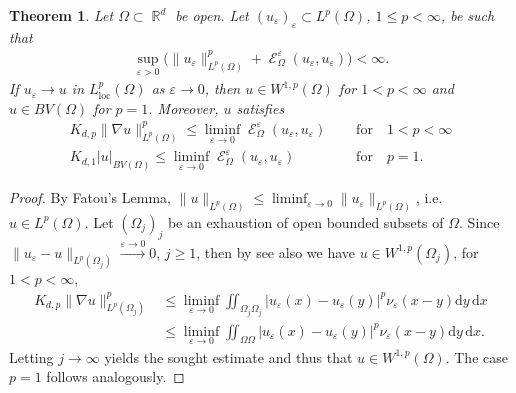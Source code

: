 \documentclass[12pt, reqno]{amsart}%
\theoremstyle{plain}  %
\newtheorem{theorem}{Theorem}[section]
\theoremstyle{definition}  %
\numberwithin{equation}{section}
\DeclareMathOperator{\loc}{loc}
\DeclareMathOperator{\cE}{\mathcal{E}}
\DeclareMathOperator{\R}{\mathbb{R}}
\newcommand{\iil}{\iint}
\renewcommand{\d}{\mathrm{d}}
\newcommand{\eps}{\varepsilon}
\begin{document}
\begin{theorem}\label{thm:BBM-liminf}
Let  $\Omega\subset \R^d$ be  open. Let   $(u_\eps)_\eps\subset L^p(\Omega)$, $1\leq p<\infty$, be such that
\begin{align*}
\sup_{\eps>0} \big(\|u_\eps\|^p_{L^p(\Omega)}+ \cE^\eps_\Omega(u_\eps,u_\eps)\big)<\infty.
\end{align*}
\noindent If $u_\eps\to u $ in $L^p_{\loc}(\Omega)$  as $\eps\to0$, then  $u\in W^{1,p}(\Omega)$ for $1<p<\infty$ and $u\in BV(\Omega)$  for $p=1$. Moreover, $u$  satisfies
\begin{align*}
K_{d,p}\|\nabla u\|^p_{L^p(\Omega)}\leq \liminf_{\eps\to0}\cE^\eps_\Omega(u_\eps,u_\eps)
&\quad \text{ for} \quad 1<p<\infty\\
K_{d,1}|u|_{BV(\Omega)}\leq \liminf_{\eps\to0}\cE^\eps_\Omega(u_\eps,u_\eps)
&\quad \text{ for} \quad p=1.
\end{align*}
\end{theorem}
\begin{proof}
By Fatou's Lemma, $\|u\|_{L^p(\Omega)}\leq \liminf_{\eps\to0}\|u_\eps\|_{L^p(\Omega)}$, i.e. $u\in L^p(\Omega)$. Let $(\Omega_j)_j$ be an exhaustion  of open bounded subsets of $ \Omega$. Since $\|u_\eps-u\|_{L^p(\Omega_j)}\xrightarrow{\eps\to0}0$, $j\geq1$, then by  \cite[Theorem 3.37]{guy-thesis} see also \cite{Pon04} we have $u\in W^{1,p}(\Omega_j)$, for $1<p<\infty$,
\begin{align*}
K_{d,p}\|\nabla u\|^p_{L^p(\Omega_j)}
&\leq \liminf_{\eps\to0}\iil_{ \Omega_j\Omega_j} |u_\eps(x)-u_\eps(y)|^p\nu_\eps(x-y)\d y\,\d x \\
&\leq \liminf_{\eps\to0}\iil_{ \Omega\Omega} |u_\eps(x)-u_\eps(y)|^p\nu_\eps(x-y)\d y\,\d x.
\end{align*}
Letting $j\to\infty$ yields  the sought estimate and  thus that $u\in W^{1,p}(\Omega)$. The case $p=1$ follows analogously.
\end{proof}
\end{document}
